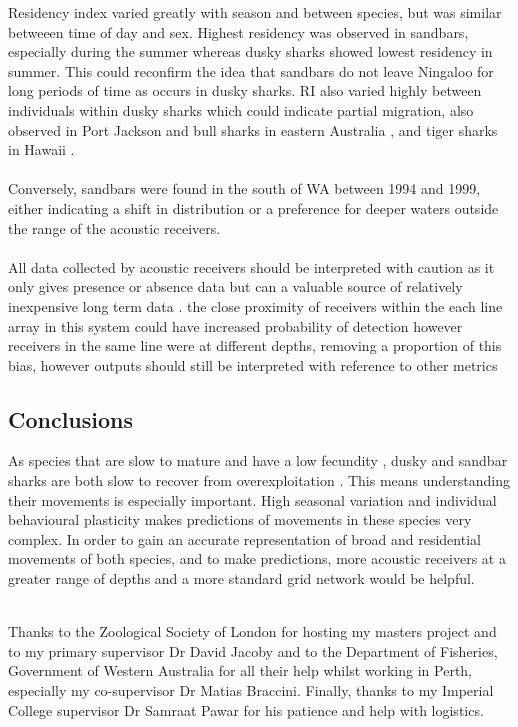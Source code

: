 \documentclass[11pt,a4paper]{article}
\begin{document}
	Residency index varied greatly with season and between species, but was similar betweeen time of day and sex. Highest residency was observed in sandbars, especially during the summer whereas dusky sharks showed lowest residency in summer. This could reconfirm the idea that sandbars do not leave Ningaloo for long periods of time as occurs in dusky sharks. RI also varied highly between individuals within dusky sharks which could indicate partial migration, also observed in Port Jackson and bull sharks in eastern Australia \citep{Bass2017,Espinoza2016}, and tiger sharks in Hawaii \citep{Papastamatiou2013}.\\
	\\
	Conversely, sandbars were found in the south of WA between 1994 and 1999, either indicating a shift in distribution or a preference for deeper waters \citep{Mcauley2003} outside the range of the acoustic receivers.\\
	\\
	All data collected by acoustic receivers should be interpreted with caution as it only gives presence or absence data but can a valuable source of relatively inexpensive long term data \citep{Speed2010,Bass2017}. the close proximity of receivers within the each line array in this system could have increased probability of detection however receivers in the same line were at different depths, removing a proportion of this bias, however outputs should still be interpreted with reference to other metrics

	\subsection{Conclusions}
	
	As species that are slow to mature and have a low fecundity \citep{Cortes2000}, dusky and sandbar sharks are both slow to recover from overexploitation \citep{Rogers2013}. This means understanding their movements is especially important. High seasonal variation and individual behavioural plasticity makes predictions of movements in these species very complex. In order to gain an accurate representation of broad and residential movements of both species, and to make predictions, more acoustic receivers at a greater range of depths and a more standard grid network would be helpful.
	\newpage
	
	\\
	
	Thanks to the Zoological Society of London for hosting my masters project and to my primary supervisor Dr David Jacoby and to the Department of Fisheries, Government of Western Australia for all their help whilst working in Perth, especially my co-supervisor Dr Matias Braccini. Finally, thanks to my Imperial College supervisor Dr Samraat Pawar for his patience and help with logistics.
	
\end{document}
